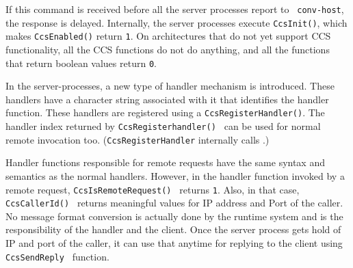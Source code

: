 If this command is received before all the server processes report to {\tt
conv-host}, the response is delayed. Internally, the server processes execute
{\tt CcsInit()}, which makes {\tt CcsEnabled()} return {\tt  1}. On
architectures that do not yet support CCS functionality, all the CCS functions
do not do anything, and all the functions that return boolean values return
{\tt  0}.

In the server-processes, a new type of handler mechanism is introduced. These
handlers have a character string associated with it that identifies the handler
function. These handlers are registered using a {\tt  CcsRegisterHandler()}.
The handler index returned by {\tt  CcsRegisterhandler() } can be used for
normal remote invocation too. ({\tt CcsRegisterHandler} internally calls
.)

Handler functions responsible for remote requests have the same syntax and
semantics as the normal \converse{} handlers. However, in the handler function
invoked by a remote request, {\tt CcsIsRemoteRequest() } returns {\tt  1}.
Also, in that case, {\tt  CcsCallerId() } returns meaningful values for IP
address and Port of the caller. No message format conversion is actually done
by the runtime system and is the responsibility of the handler and the client.
Once the server process gets hold of IP and port of the caller, it can use that
anytime for replying to the client using {\tt  CcsSendReply } function.








